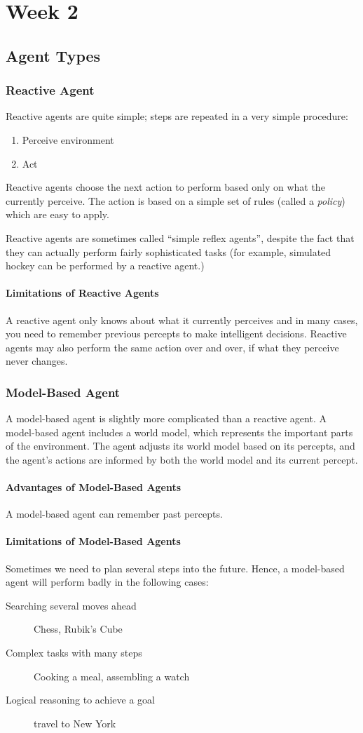 \part{Week 2}
\chapter{Agent Types}
\section{Reactive Agent}
Reactive agents are quite simple; steps are repeated in a very simple
procedure:
\begin{enumerate}
    \item Perceive environment
    \item Act
\end{enumerate}
Reactive agents choose the next action to perform based only on what the
currently perceive. The action is based on a simple set of rules (called a
\textit{policy}) which are easy to apply.

Reactive agents are sometimes called ``simple reflex agents'', despite the fact
that they can actually perform fairly sophisticated tasks (for example,
simulated hockey can be performed by a reactive agent.)
\subsection{Limitations of Reactive Agents}
A reactive agent only knows about what it currently perceives and in many
cases, you need to remember previous percepts to make intelligent decisions.
Reactive agents may also perform the same action over and over, if what they
perceive never changes.

\section{Model-Based Agent}
A model-based agent is slightly more complicated than a reactive agent. A
model-based agent includes a world model, which represents the important parts
of the environment. The agent adjusts its world model based on its percepts,
and the agent's actions are informed by both the world model and its current
percept.
\subsection{Advantages of Model-Based Agents}
A model-based agent can remember past percepts.
\subsection{Limitations of Model-Based Agents}
Sometimes we need to plan several steps into the future. Hence, a model-based
agent will perform badly in the following cases:
\begin{description}
    \item[Searching several moves ahead] Chess, Rubik's Cube
    \item[Complex tasks with many steps] Cooking a meal, assembling a watch
    \item[Logical reasoning to achieve a goal] travel to New York
\end{description}


